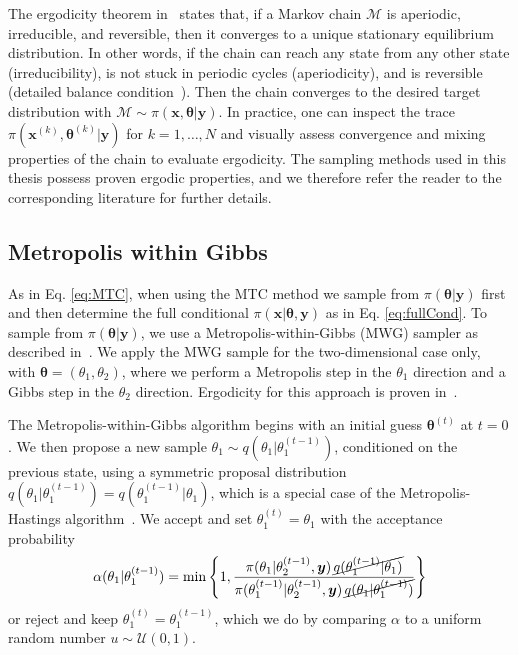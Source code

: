The ergodicity theorem in~\cite{tan2016LecNot} states that, if a Markov chain $\mathcal{M}$ is aperiodic, irreducible, and reversible, then it converges to a unique stationary equilibrium distribution.
In other words, if the chain can reach any state from any other state (irreducibility), is not stuck in periodic cycles (aperiodicity), and is reversible (detailed balance condition~\cite{tan2016LecNot}).
Then the chain converges to the desired target distribution  with $ \mathcal{M} \sim \pi(\bm{x}, \bm{\theta} |  \bm{y})$.
In practice, one can inspect the trace $\pi(\bm{x}^{(k)}, \bm{\theta}^{(k)} |  \bm{y})$ for $k = 1, \dots, N$ and visually assess convergence and mixing properties of the chain to evaluate ergodicity.
The sampling methods used in this thesis possess proven ergodic properties, and we therefore refer the reader to the corresponding literature for further details.

\subsection{Metropolis within Gibbs}
\label{subsec:MWG}
As in Eq. \ref{eq:MTC}, when using the MTC method we sample from $\pi(\bm{\theta} |  \bm{y})$ first and then determine the full conditional $\pi(\bm{x} | \bm{\theta} , \bm{y})$ as in Eq. \ref{eq:fullCond}. To sample from $\pi(\bm{\theta} |  \bm{y})$, we use a Metropolis-within-Gibbs (MWG) sampler as described in~\cite{fox2016fast}.
We apply the MWG sample for the two-dimensional case only, with $\bm{\theta} = (\theta_1, \theta_2)$, where we perform a Metropolis step in the $\theta_1$ direction and a Gibbs step in the $\theta_2$ direction.
Ergodicity for this approach is proven in~\cite{roberts2006harris}.


The Metropolis-within-Gibbs algorithm begins with an initial guess $\bm{\theta}^{(t)}$ at $t=0$. We then propose a new sample $\theta_1 \sim q(\theta_1 |  \theta_1^{(t-1)})$, conditioned on the previous state, using a symmetric proposal distribution $q(\theta_1 |  \theta_1^{(t-1)}) = q(\theta_1^{(t-1)} |  \theta_1)$, which is a special case of the Metropolis-Hastings algorithm~\cite{roberts2006harris}.
We accept and set $\theta_1^{(t)} = \theta_1$ with the acceptance probability
\begin{align}
	\alpha(\theta_1 |  \theta_1^{(t-1)}) = \min \left\{ 1, \frac{\pi(\theta_1 |  \theta_2^{(t-1)}, \bm{y}) \, \cancel{q(\theta_1^{(t-1)} |  \theta_1)}}{\pi(\theta_1^{(t-1)} |  \theta_2^{(t-1)}, \bm{y}) \, \cancel{q(\theta_1 |  \theta_1^{(t-1)})}} \right\}
\end{align}
or reject and keep $\theta_1^{(t)} = \theta_1^{(t-1)}$, which we do by comparing $\alpha$ to a uniform random number $u \sim \mathcal{U}(0,1)$. 


